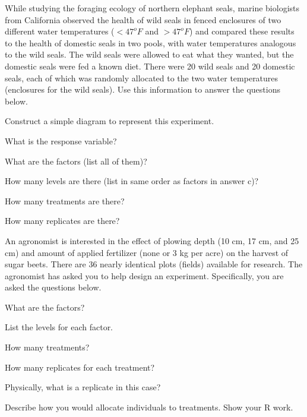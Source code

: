 \documentclass[10pt,openany]{book}\usepackage[]{graphicx}\usepackage[]{color}
\begin{document}
\begin{exsection}
  \item \label{revex:ExpDSeals} While studying the foraging ecology of northern elephant seals, marine biologists from California observed the health of wild seals in fenced enclosures of two different water temperatures ($<47^{o}F$ and $>47^{o}F$) and compared these results to the health of domestic seals in two pools, with water temperatures analogous to the wild seals.  The wild seals were allowed to eat what they wanted, but the domestic seals were fed a known diet.  There were 20 wild seals and 20 domestic seals, each of which was randomly allocated to the two water temperatures (enclosures for the wild seals).  Use this information to answer the questions below. 
\begin{Enumerate}
  \item Construct a simple diagram to represent this experiment.
  \item What is the response variable?
  \item What are the factors (list all of them)?
  \item How many levels are there (list in same order as factors in answer c)?
  \item How many treatments are there?
  \item How many replicates are there?
\end{Enumerate}

  \item \label{revex:ExpDFert1} An agronomist is interested in the effect of plowing depth (10 cm, 17 cm, and 25 cm) and amount of applied fertilizer (none or 3 kg per acre) on the harvest of sugar beets. There are 36 nearly identical plots (fields) available for research.  The agronomist has asked you to help design an experiment.  Specifically, you are asked the questions below.  
\begin{Enumerate}
  \item What are the factors?
  \item List the levels for each factor.
  \item How many treatments?
  \item How many replicates for each treatment?
  \item Physically, what is a replicate in this case?
  \item \rhw{} Describe how you would allocate individuals to treatments.  Show your R work.
\end{Enumerate}


\end{exsection}
\end{document}
